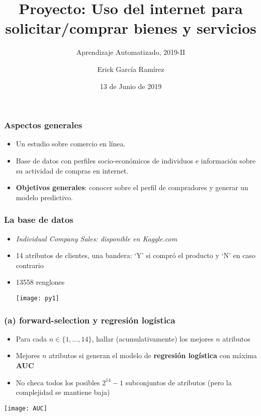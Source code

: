 \documentclass{beamer}
\title[Proyecto final]{Proyecto: Uso del internet para solicitar/comprar bienes y servicios}
\subtitle{Aprendizaje Automatizado, 2019-II}
\author{Erick García Ramírez}
\institute{MCIC--IIMAS, UNAM}
\date{13 de Junio de 2019}
\begin{document}
\begin{frame}
\maketitle
\end{frame}
\begin{frame}
    \frametitle{Aspectos generales}
    \begin{itemize}
        \item Un estudio sobre comercio en línea. 
        \item Base de datos con perfiles socio-económicos de individuos e información sobre su actividad de
            compras en internet. 
        \item {\bf Objetivos generales}: conocer sobre el perfil de compradores y generar un modelo predictivo. 
        \end{itemize}
\end{frame} 

\begin{frame}[fragile]
    \frametitle{La base de datos} 
    \begin{itemize}
        \item \emph{Individual Company Sales: disponible en Kaggle.com }
        \item 14 atributos de clientes, una bandera: `Y' si compró el producto y `N' en caso contrario
        \item 13558 renglones
        \begin{center}
            \texttt{[image: py1]}
        \end{center}
    \end{itemize}
\end{frame}

\begin{frame}
    \frametitle{(a) forward-selection y regresión logística}
    \begin{itemize}
        \item Para cada $n\in \{1,\dots, 14\}$, hallar (acumulativamente) los mejores $n$ atributos
        \item Mejores $n$ atributos si generan el modelo de {\bf regresión logística} con máxima {\bf AUC}
        \item No checa  todos los posibles $2^{14}-1$ subconjuntos de atributos (pero la complejidad se mantiene baja)
    \end{itemize}
    \vspace{-0.8\baselineskip}
        \begin{center}
            \texttt{[image: AUC]}
        \end{center}
    \end{frame} 
\end{document}
